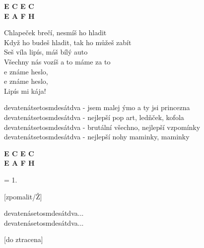 
\re{}
{\footnotesize\textbf{E C E C\guitarSharp{}}}\\
{\footnotesize\textbf{E A F\guitarSharp{} H}}

\ve{}
Chlapeček brečí, nesmíš ho hladit\\
Když ho budeš hladit, tak ho můžeš zabít\\
Seš víla lipís, máš bílý auto\\
Všechny nás vozíš a to máme za to\\
e známe heslo, \\
e známe heslo, \\
Lipís mi kája! 

\cho{}
devatenátsetosmdesátdva - jsem malej ýmo a ty jsi princezna\\
devatenátsetosmdesátdva - nejlepší pop art, ledňček, kofola\\
devatenátsetosmdesátdva - brutální všechno, nejlepší vzpomínky\\
devatenátsetosmdesátdva - nejlepší nohy maminky, maminky

\re{}
{\footnotesize\textbf{E C E C\guitarSharp{}}}\\
{\footnotesize\textbf{E A F\guitarSharp{} H}}

\ve{}
= 1.

\cho{}

\cho{}
[zpomalit/Ž]

devatenásetosmdesátdva...\\
devatenásetosmdesátdva...

\cho{}

\cho{}
[do ztracena]

\esong{}
